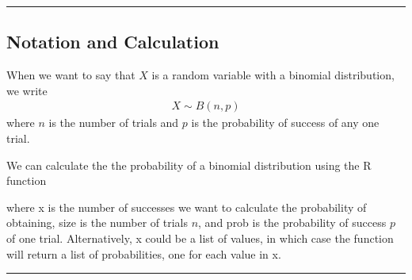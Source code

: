 \documentclass[letterpaper,10pt,english]{jupyterBook}
\begin{document}
\bigskip\hrule\bigskip



\subsection{Notation and Calculation}
\label{\detokenize{Ch3 Probability/3.6 The Binomial Distribution:notation-and-calculation}}
\sphinxAtStartPar
When we want to say that \(X\) is a random variable with a binomial distribution, we write
\begin{equation*}
\begin{split} X \sim B(n, p) \end{split}
\end{equation*}
\sphinxAtStartPar
where \(n\) is the number of trials and \(p\) is the probability of success of any one trial.

\sphinxAtStartPar
We can calculate the the probability of a binomial distribution using the R function

\begin{sphinxVerbatim}[commandchars=\\\{\}]
\end{sphinxVerbatim}

\sphinxAtStartPar
where x is the number of successes we want to calculate the probability of obtaining, size is the number of trials \(n\), and prob is the probability of success \(p\) of one trial. Alternatively, x could be a list of values, in which case the function will return a list of probabilities, one for each value in x.


\bigskip\hrule\bigskip
\end{document}
